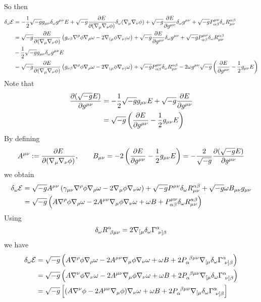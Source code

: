 So then
\begin{align*}
  \delta_\omega \mathcal{E}&=-\frac{1}{2}\sqrt{-g}g_{\mu\nu }\delta_\omega g^{\mu\nu }E+\sqrt{-g}\pdv{E}{(\nabla_\mu\nabla_\nu\phi)}\delta_\omega (\nabla_\mu \nabla_\nu \phi )+\sqrt{-g}\pdv{E}{g^{\mu\nu}}\delta_\omega g^{\mu\nu }+\sqrt{-g}P^{\mu\nu }_{\alpha\beta }\delta_\omega R^{\alpha\beta }_{\mu\nu }\\
  &=\sqrt{-g}\pdv{E}{(\nabla_\mu\nabla_\nu\phi)}\left(g_{\nu\beta }\nabla^\rho \phi\nabla_\rho\omega-2\nabla_{(\mu }\phi\nabla_{\nu)}\omega\right)+\sqrt{-g}\pdv{E}{g^{\mu\nu}}\delta_\omega g^{\mu\nu }+\sqrt{-g}P^{\mu\nu }_{\alpha\beta }\delta_\omega R^{\alpha\beta }_{\mu\nu }\\& -\frac{1}{2}\sqrt{-g}g_{\mu\nu }\delta_\omega g^{\mu\nu }E\\
  &=\sqrt{-g}\pdv{E}{(\nabla_\mu\nabla_\nu\phi)}\left(g_{\nu\beta }\nabla^\rho \phi\nabla_\rho\omega-2\nabla_{(\mu }\phi\nabla_{\nu)}\omega\right)+\sqrt{-g}P^{\mu\nu }_{\alpha\beta }\delta_\omega R^{\alpha\beta }_{\mu\nu }-2\omega g^{\mu\nu}\sqrt{-g}\left(\pdv{E}{g^{\mu\nu}}-\frac{1}{2}g_{\mu\nu }E\right)
\end{align*}
Note that
\begin{align}
  \pdv{(\sqrt{-g}E)}{g^{\mu\nu}}&=-\frac{1}{2}\sqrt{-g}g_{\mu\nu }E+\sqrt{-g}\pdv{E}{g^{\mu\nu}}\\
  &=\sqrt{-g}\left(\pdv{E}{g^{\mu\nu}}-\frac{1}{2}g_{\mu\nu }E\right) \label{d-sqrt-E}
\end{align}
By defining
\begin{align}\label{A-B}
  A^{\mu\nu }:=\pdv{E}{(\nabla_\mu\nabla_\nu\phi)},\qquad B_{\mu\nu }=-2\left(\pdv{E}{g^{\mu\nu}}-\frac{1}{2}g_{\mu\nu }E\right)=-\frac{2}{\sqrt{-g}}\pdv{(\sqrt{-g}E)}{g^{\mu\nu}}
\end{align}
we obtain
\begin{align}
  \delta_\omega \mathcal{E}&=\sqrt{-g}A^{\mu\nu }\left(\gamma_{\mu\nu }\nabla^\rho \phi \nabla_\rho \omega-2\nabla_\mu \phi\nabla_\nu \omega\right)+\sqrt{-g}P^{\mu\nu }\delta_\omega R^{\alpha\beta }_{\mu\nu }+\sqrt{-g}\omega B_{\mu\nu }g_{\mu\nu }\\
  &=\sqrt{-g}\left(A\nabla^\rho \phi\nabla_\rho \omega-2A^{\mu\nu}\nabla_\mu \phi\nabla_\nu\omega+\omega B+P^{\mu\nu}_{\alpha\beta}\delta_\omega R^{\alpha\beta }_{\mu\nu }\right)
\end{align}
Using
\begin{equation}
  \delta_\omega R^\alpha _{~\beta\mu\nu }=2\nabla_{[\mu }\delta_\omega \Gamma^\alpha _{~\nu]\beta }
\end{equation}
we have
\begin{align}
    \delta_\omega \mathcal{E}&=\sqrt{-g}\left(A\nabla^\rho \phi\nabla_\rho \omega-2A^{\mu\nu}\nabla_\mu \phi\nabla_\nu\omega+\omega B+2P_\alpha ^{~\beta\mu\nu }\nabla_{[\mu }\delta_\omega \Gamma^{\alpha }_{~\nu]\beta }\right)\\
    &=\sqrt{-g}\left(A\nabla^\nu \phi\nabla_\nu  \omega-2A^{\mu\nu}\nabla_\mu \phi\nabla_\nu\omega+\omega B+2P_\alpha ^{~\beta\mu\nu }\nabla_{[\mu }\delta_\omega \Gamma^{\alpha }_{~\nu]\beta }\right)\\
    &=\sqrt{-g}\left[(A\nabla^\nu \phi -2A^{\mu\nu }\nabla_\mu\phi )\nabla_\nu \omega+\omega B+2P_\alpha ^{~\beta\mu\nu }\nabla_{[\mu }\delta_\omega \Gamma^{\alpha }_{~\nu]\beta }\right]
\end{align}

